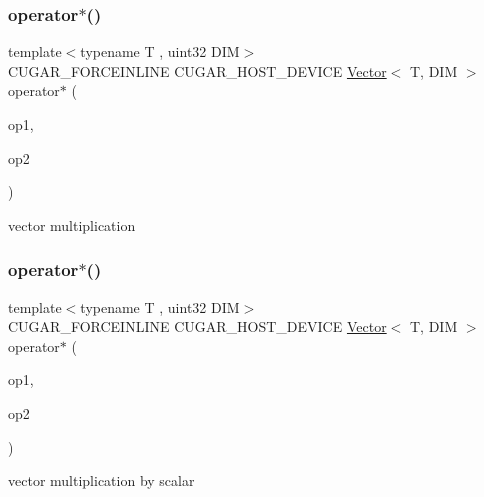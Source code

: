 \subsubsection{\texorpdfstring{operator$\ast$()}{operator*()}\hspace{0.1cm}{\footnotesize\ttfamily [2/3]}}
{\footnotesize\ttfamily template$<$typename T , uint32 D\+IM$>$ \\
C\+U\+G\+A\+R\+\_\+\+F\+O\+R\+C\+E\+I\+N\+L\+I\+NE C\+U\+G\+A\+R\+\_\+\+H\+O\+S\+T\+\_\+\+D\+E\+V\+I\+CE \hyperlink{structcugar_1_1_vector}{Vector}$<$ T, D\+IM $>$ operator$\ast$ (\begin{DoxyParamCaption}\item[{const T}]{op1,  }\item[{const \hyperlink{structcugar_1_1_vector}{Vector}$<$ T, D\+IM $>$ \&}]{op2 }\end{DoxyParamCaption})\hspace{0.3cm}{\ttfamily [related]}}

vector multiplication \mbox{\label{group___vectors_module_ga81f6bb4e3ffbaa260e0713f8891b8909}} 
\subsubsection{\texorpdfstring{operator$\ast$()}{operator*()}\hspace{0.1cm}{\footnotesize\ttfamily [3/3]}}
{\footnotesize\ttfamily template$<$typename T , uint32 D\+IM$>$ \\
C\+U\+G\+A\+R\+\_\+\+F\+O\+R\+C\+E\+I\+N\+L\+I\+NE C\+U\+G\+A\+R\+\_\+\+H\+O\+S\+T\+\_\+\+D\+E\+V\+I\+CE \hyperlink{structcugar_1_1_vector}{Vector}$<$ T, D\+IM $>$ operator$\ast$ (\begin{DoxyParamCaption}\item[{const \hyperlink{structcugar_1_1_vector}{Vector}$<$ T, D\+IM $>$ \&}]{op1,  }\item[{const T}]{op2 }\end{DoxyParamCaption})\hspace{0.3cm}{\ttfamily [related]}}

vector multiplication by scalar \mbox{\label{group___vectors_module_ga533de6fa3d06d8337631ef848e63a1a5}} 
